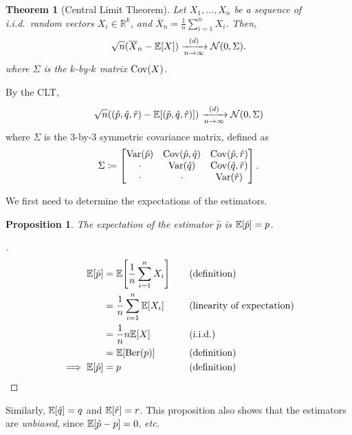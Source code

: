\documentclass[letterpaper, oneside, reqno]{amsart}
\newtheorem{theorem}{Theorem}[section]
\newtheorem{prop}{Proposition}[section]
\renewcommand{\qedsymbol}{\ensuremath{\blacksquare}}
\newenvironment{subproof}[1][\proofname]{%
  \renewcommand{\qedsymbol}{\ensuremath{\square}}%
  \begin{proof}[#1]%
}{%
  \end{proof}%
}
\numberwithin{equation}{section}
\newcommand{\E}[1]{\mathbb{E}\mleft[#1\mright]}
\newcommand{\Var}[1]{\operatorname{Var}\mleft(#1\mright)}
\newcommand{\Cov}[1]{\operatorname{Cov}\mleft(#1\mright)}
\newcommand{\R}{\mathbb{R}}  %
\newcommand{\N}[2]{\mathcal{N}\mleft( #1, #2 \mright)}
\newcommand{\iid}{i.i.d.}
\newcommand{\sumi}[2]{\sum_{#1=1}^{#2}}
\newcommand{\avg}[2]{\frac{1}{#2}\sumi{#1}{#2}}
\newcommand{\by}[1]{&\quad&\text{(#1)}}
\newcommand{\Dlim}{\xrightarrow[n \to \infty]{(d)}}
\newcommand{\phat}{\hat{p}}
\newcommand{\qhat}{\hat{q}}
\newcommand{\rhat}{\hat{r}}
\newcommand{\Xnbar}{\overline{X}_n}
\DeclareMathOperator{\Ber}{Ber}
\begin{document}
\begin{theorem}[Central Limit Theorem]
    Let $X_1, \dots, X_n$ be a sequence of \iid\ random vectors $X_i \in \R^k$, 
    and $\Xnbar = \avg{i}{n} X_i$.
    Then,
    \[ \sqrt{n}(\Xnbar - \E{X}) \Dlim \N{0}{\Sigma}. \]
    where $\Sigma$ is the $k$-by-$k$ matrix $\Cov{X}$.
\end{theorem}

By the CLT,
\begin{equation} \label{eq:CLT}
  \sqrt{n} ((\phat, \qhat, \rhat) - \E{(\phat, \qhat, \rhat)}) \Dlim \N{0}{\Sigma}
\end{equation}
where $\Sigma$ is the 3-by-3 symmetric covariance matrix, defined as
\begin{equation}
  \Sigma \coloneqq 
  \begin{bmatrix}
    \Var{\phat} & \Cov{\phat, \qhat} & \Cov{\phat, \rhat} \\
    \cdot & \Var{\qhat} & \Cov{\qhat, \rhat} \\
    \cdot & \cdot & \Var{\rhat}
  \end{bmatrix}.
\end{equation}

We first need to determine the expectations of the estimators.

\begin{prop}
  The expectation of the estimator $\phat$ is $\E{\phat} = p$.
\end{prop}
\begin{subproof}
  \begin{alignat*}{3}
    \E{\phat} &= \E{\avg{i}{n} X_i} \by{definition} \\
              &= \frac{1}{n} \sumi{i}{n} \E{X_i} \by{linearity of expectation} \\
              &= \frac{1}{n} n \E{X} \by{\iid} \\
              &= \E{\Ber(p)} \by{definition} \\
    \implies \E{\phat} &= p \by{definition} \qedhere
  \end{alignat*}
\end{subproof}
\noindent Similarly, $\E{\qhat} = q$ and $\E{\rhat} = r$. This proposition
also shows that the estimators are \emph{unbiased}, since $\E{\phat - p} = 0$,
\emph{etc}.
\end{document}
